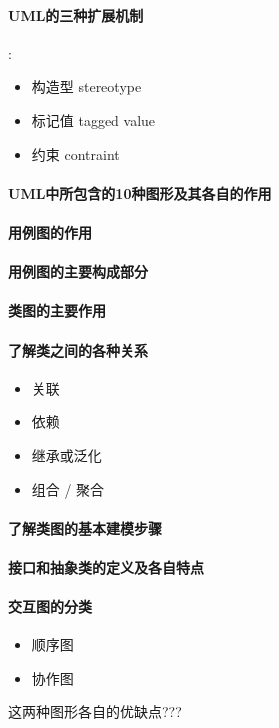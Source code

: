 \documentclass[UTF8,a4paper]{ctexart}
\begin{document}
\paragraph{UML的三种扩展机制}:
\begin{itemize}
  \item 构造型 stereotype
  \item 标记值 tagged value
  \item 约束 contraint
\end{itemize}

\paragraph{UML中所包含的10种图形及其各自的作用}

\paragraph{用例图的作用}

\paragraph{用例图的主要构成部分}

\paragraph{类图的主要作用}

\paragraph{了解类之间的各种关系}
\begin{itemize}
  \item 关联
  \item 依赖
  \item 继承或泛化
  \item 组合 / 聚合
\end{itemize}

\paragraph{了解类图的基本建模步骤}

\paragraph{接口和抽象类的定义及各自特点}

\paragraph{交互图的分类}
\begin{itemize}
  \item 顺序图
  \item 协作图
\end{itemize}
这两种图形各自的优缺点???
\end{document}
